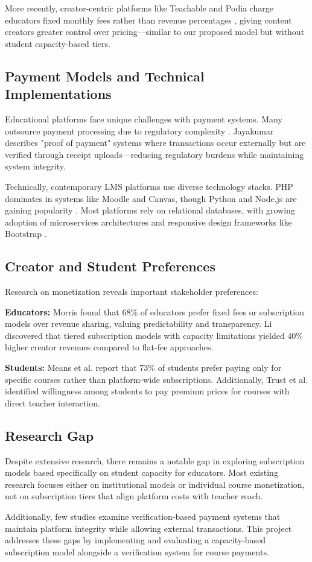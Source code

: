 More recently, creator-centric platforms like Teachable and Podia charge educators fixed monthly fees rather than revenue percentages \cite{goel2019}, giving content creators greater control over pricing—similar to our proposed model but without student capacity-based tiers.

\subsection{Payment Models and Technical Implementations}

Educational platforms face unique challenges with payment systems. Many outsource payment processing due to regulatory complexity \cite{arasil2018}. Jayakumar \cite{jayakumar2020} describes "proof of payment" systems where transactions occur externally but are verified through receipt uploads—reducing regulatory burdens while maintaining system integrity.

Technically, contemporary LMS platforms use diverse technology stacks. PHP dominates in systems like Moodle and Canvas, though Python and Node.js are gaining popularity \cite{papadakis2018}. Most platforms rely on relational databases, with growing adoption of microservices architectures \cite{severance2012} and responsive design frameworks like Bootstrap \cite{wong2016}.

\subsection{Creator and Student Preferences}

Research on monetization reveals important stakeholder preferences:

\textbf{Educators:} Morris \cite{morris2021} found that 68\% of educators prefer fixed fees or subscription models over revenue sharing, valuing predictability and transparency. Li \cite{li2019a} discovered that tiered subscription models with capacity limitations yielded 40\% higher creator revenues compared to flat-fee approaches.

\textbf{Students:} Means et al. \cite{means2015} report that 73\% of students prefer paying only for specific courses rather than platform-wide subscriptions. Additionally, Trust et al. \cite{trust2018} identified willingness among students to pay premium prices for courses with direct teacher interaction.

\subsection{Research Gap}

Despite extensive research, there remains a notable gap in exploring subscription models based specifically on student capacity for educators. Most existing research focuses either on institutional models or individual course monetization, not on subscription tiers that align platform costs with teacher reach.

Additionally, few studies examine verification-based payment systems that maintain platform integrity while allowing external transactions. This project addresses these gaps by implementing and evaluating a capacity-based subscription model alongside a verification system for course payments.